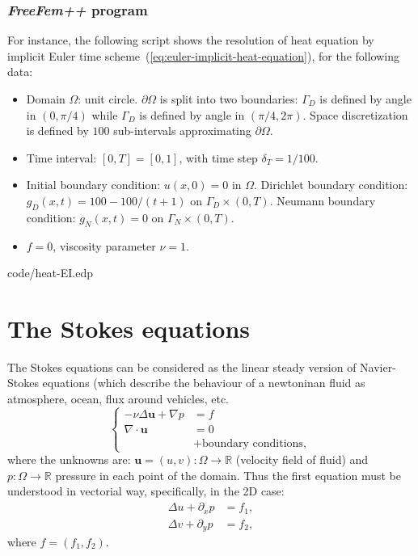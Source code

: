 \documentclass[12pt]{article}
\newcommand{\FF}{\textit{FreeFem++}\xspace}
\newcommand{\R}{{\mathbb R}}
\begin{document}
\subsubsection{\FF program}
For instance, the following script shows the resolution of heat
equation by implicit Euler time
scheme~(\ref{eq:euler-implicit-heat-equation}), for the following data:
\begin{itemize}
\item Domain $\Omega$: unit circle.  $\partial\Omega$ is split
  into two boundaries: $\Gamma_D$ is defined by angle in $(0,\pi/4)$
  while $\Gamma_D$ is defined by angle in $(\pi/4,2\pi)$. Space
  discretization is defined by $100$ sub-intervals approximating
  $\partial\Omega$.
\item Time interval: $[0,T]=[0,1]$, with time step $\delta_T=1/100$.
\item Initial boundary condition: $u(x,0)=0$ in $\Omega$. Dirichlet
  boundary condition: $g_D(x,t)= 100-100/(t+1)$ on
  $\Gamma_D\times (0,T)$. Neumann boundary condition: $g_N(x,t)=0$ on
  $\Gamma_N\times (0,T)$.
\item $f=0$, viscosity parameter $\nu=1$.
\end{itemize}


{code/heat-EI.edp}

\appendix

\section{The Stokes equations}
\label{sec:stokes}

The Stokes equations can be considered as the linear steady version of
Navier-Stokes equations (which describe the behaviour of a newtoninan
fluid as atmosphere, ocean, flux around vehicles, etc.
\begin{equation*}
  \left\{
  \begin{aligned}
    -\nu\Delta \mathbf{u}+ \nabla p &= f
    \\
    \nabla\cdot \mathbf{u} & = 0
    \\ & + \text{boundary conditions},
  \end{aligned}
  \right.
\end{equation*}
where the unknowns are: $\mathbf{u}=(u,v):\Omega\to\R$ (velocity field
of fluid) and $p:\Omega\to\R$ pressure in each point of the domain.
Thus the first equation must be understood in vectorial way,
specifically, in the 2D case:
\begin{align*}
  \Delta u + \partial_x p &= f_1, \\
  \Delta v + \partial_y p &= f_2,
\end{align*}
where  $f=(f_1,f_2)$.
\end{document}
